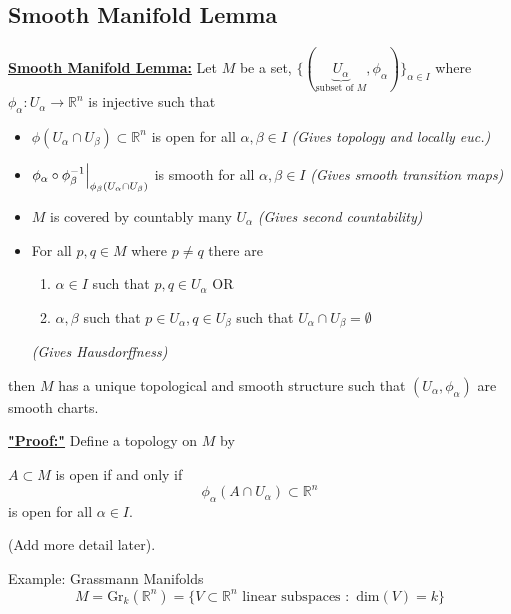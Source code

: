 \documentclass{article}
\newcommand{\R}{\mathbb{R}}
\newcommand{\restr}[2]{{%
  \left.\kern-\nulldelimiterspace %
  #1 %
  \vphantom{\big|} %
  \right|_{#2} %
  }}
\begin{document}
\subsection{Smooth Manifold Lemma}
\vskip 0.5cm  
\begin{dottedbox}
  \underline{\textbf{Smooth Manifold Lemma:}} Let $M$ be a set, $\{ (\underbrace{U_{\alpha}}_{\text{subset of $M$}}, \phi_{\alpha}) \}_{\alpha \in I}$ where $\phi_{\alpha} : U_{\alpha} \rightarrow \R^n$ is injective such that 
  \begin{itemize}
    \item $\phi(U_{\alpha} \cap U_{\beta}) \subset \R^n$ is open for all $\alpha, \beta \in I$ \emph{(Gives topology and locally euc.)}
    
    \item $\restr{\phi_{\alpha} \circ \phi_{\beta}^{-1}}{\phi_{\beta}(U_{\alpha} \cap U_{\beta})}$ is smooth for all $\alpha, \beta \in I$ \emph{(Gives smooth transition maps)}
    
    \item $M$ is covered by countably many $U_{\alpha}$ \emph{(Gives second countability)}
    
    \item For all $p, q \in M$ where $p \neq q$ there are 
    \begin{enumerate}
      \item $\alpha \in I$ such that $p, q \in U_{\alpha}$ OR  
      \item $\alpha, \beta$ such that $p \in U_{\alpha}, q \in U_{\beta}$ such that $U_{\alpha} \cap U_{\beta} = \emptyset$
    \end{enumerate}
    \emph{(Gives Hausdorffness)}
  \end{itemize}
  then $M$ has a unique topological and smooth structure such that $(U_{\alpha}, \phi_{\alpha})$ are smooth charts.
\end{dottedbox}

\vskip 0.5cm  


\begin{mathdefinitionbox}{}
\vskip 0.5cm  
  \underline{\textbf{"Proof:"}}
  Define a topology on $M$ by 
  
  \vskip 0.5cm  
  $A \subset M$ is open if and only if
  \[ \phi_{\alpha}(A \cap U_{\alpha}) \subset \R^n \]
  is open for all $\alpha \in I$.

  \vskip 0.5cm  
  (Add more detail later).
\end{mathdefinitionbox}

\vskip 1cm  
\begin{mathdefinitionbox}{Example: Grassmann Manifolds}
  \vskip 0.25cm  
  \[ M = \text{Gr}_{k}(\R^n) = \{ V \subset \R^n \text{ linear subspaces }: \text{ dim}(V) = k  \} \]
\end{mathdefinitionbox}
\end{document}

